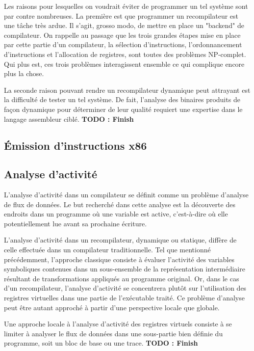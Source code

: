 \documentclass{article} %
\begin{document}
Les raisons pour lesquelles on voudrait éviter de programmer un tel système sont par contre nombreuses. La première est que programmer un recompilateur est une tâche très ardue. Il s'agit, grosso modo, de mettre en place un "backend" de compilateur. On rappelle au passage que les trois grandes étapes mise en place par cette partie d'un compilateur, la sélection d'instructions, l'ordonnancement d'instructions et l'allocation de registres, sont toutes des problèmes NP-complet. Qui plus est, ces trois problèmes interagissent ensemble ce qui complique encore plus la chose. 

La seconde raison pouvant rendre un recompilateur dynamique peut attrayant est la difficulté de tester un tel système. De fait, l'analyse des binaires produits de façon dynamique pour déterminer de leur qualité requiert une expertise dans le langage assembleur ciblé. \textbf{TODO : Finish}

\subsection{Émission d'instructions x86}

\subsection{Analyse d'activité}
L'analyse d'activité dans un compilateur se définit comme un problème d'analyse de flux de données. Le but recherché dans cette analyse est la découverte des endroits dans un programme où une variable est active, c'est-à-dire où elle potentiellement lue avant sa prochaine écriture.

L'analyse d'activité dans un recompilateur, dynamique ou statique, diffère de celle effectuée dans un compilateur traditionnelle. Tel que mentionné précédemment, l'approche classique consiste à évaluer l'activité des variables symboliques contenues dans un sous-ensemble de la représentation intermédiaire résultant de transformations appliqués au programme original. Or, dans le cas d'un recompilateur, l'analyse d'activité se concentrera plutôt sur l'utilisation des registres virtuelles dans une partie de l'exécutable traité. Ce problème d'analyse peut être autant approché à partir d'une perspective locale que globale.

Une approche locale à l'analyse d'activité des registres virtuels consiste à se limiter à analyser le flux de données dans une sous-partie bien définie du programme, soit un bloc de base ou une trace. \textbf{TODO : Finish}
\end{document}
